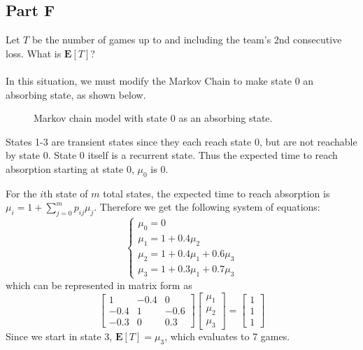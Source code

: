 \documentclass{amsart}
\begin{document}
	\subsection{Part F}
	Let $T$ be the number of games up to and including the team's 2nd consecutive loss. What is $\mathbf{E}[T]$?\\
	\\
	In this situation, we must modify the Markov Chain to make state 0 an absorbing state, as shown below.
	\begin{figure}[h!]
		\centering
		\caption{Markov chain model with state 0 as an absorbing state.}
	\end{figure}

	States 1-3 are transient states since they each reach state 0, but are not reachable by state 0. State 0 itself is a recurrent state. Thus the expected time to reach absorption starting at state 0, $\mu_0$ is 0.
	
	For the $i$th state of $m$ total states, the expected time to reach absorption is $\mu_i = 1+ \sum_{j=0}^{m}p_{ij}\mu_j$. Therefore we get the following system of equations:
	\[
		\begin{cases}
		\mu_0 = 0\\
		\mu_1 = 1 + 0.4\mu_2\\
		\mu_2 = 1 + 0.4\mu_1 + 0.6\mu_3\\
		\mu_3 = 1 + 0.3\mu_1 + 0.7\mu_3
		\end{cases}
	\]
	which can be represented in matrix form as
	\[
	\begin{bmatrix}
	1 & -0.4 & 0\\
	-0.4 & 1 & -0.6\\
	-0.3 & 0 & 0.3
	\end{bmatrix}
	\begin{bmatrix}
	\mu_1\\\mu_2\\\mu_3
	\end{bmatrix}
	=
	\begin{bmatrix}
	1\\1\\1
	\end{bmatrix}
	\]
	Since we start in state 3, $\mathbf{E}[T] = \mu_3$, which evaluates to 7 games.
	\\
\end{document}
